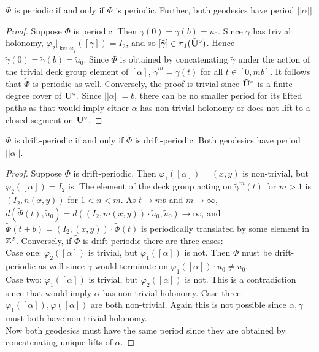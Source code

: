 \documentclass[]{article}
\def\btUs{\btU^\circ}
\def\utild{\tilde{u}_0}
\def\gamtild{\tilde{\gamma}}
\begin{document}
\begin{thm}
$\Phi$ is periodic if and only if $\tilde{\Phi}$ is periodic. Further, both geodesics have period $||\alpha||$.
\begin{proof}
Suppose $\Phi$ is periodic. Then $\gamma(0)=\gamma(b)=u_0$. Since $\gamma$ has trivial holonomy, $\varphi_2\big\vert_{\ker\varphi_1}([\gamma])=I_2$, and so $[\tilde{\gamma}]\in\pi_1(\btUs)$. Hence $\gamtild(0)=\gamtild(b)=\utild$. Since $\tilde{\Phi}$ is obtained by concatenating $\gamtild$ under the action of the trivial deck group element of $[\alpha]$, $\gamtild^m=\gamtild(t)$ for all $t\in[0,mb]$. It follows that $\tilde{\Phi}$ is periodic as well. Conversely, the proof is trivial since $\btUs$ is a finite degree cover of $\mathbf{U}^\circ.$ Since $||\alpha||=b$, there can be no smaller period for its lifted paths as that would imply either $\alpha$ has non-trivial holonomy or does not lift to a closed segment on $\mathbf{U}^\circ$.
\end{proof}
\end{thm}

\begin{thm}
$\Phi$ is drift-periodic if and only if $\tilde{\Phi}$ is drift-periodic. Both geodesics have period $||\alpha||$.
\begin{proof}
Suppose $\Phi$ is drift-periodic. Then $\varphi_1([\alpha])=(x,y)$ is non-trivial, but $\varphi_2([\alpha])=I_2$ is. The element of the deck group acting on $\gamtild^m(t)$ for $m>1$ is $(I_2,n(x,y))$ for $1<n<m$. As $t\to mb$ and $m\to\infty$, $d(\tilde\Phi(t),\utild)=d((I_2,m(x,y))\cdot \utild, \utild)\to\infty$, and $\tilde{\Phi}(t+b)=(I_2,(x,y))\cdot \tilde{\Phi}(t)$ is periodically translated by some element in $\mathbb{Z}^2$. Conversely, if $\tilde{\Phi}$ is drift-periodic there are three cases:\\
Case one: $\varphi_2([\alpha])$ is trivial, but $\varphi_1([\alpha])$ is not. Then $\Phi$ must be drift-periodic as well since $\gamma$ would terminate on $\varphi_1([\alpha])\cdot u_0\neq u_0$.\\
Case two: $\varphi_1([\alpha])$ is trivial, but $\varphi_2([\alpha])$ is not. This is a contradiction since that would imply $\alpha$ has non-trivial holonomy.
Case three:$\varphi_1([\alpha]),\varphi([\alpha])$ are both non-trivial. Again this is not possible since $\alpha,\gamma$ must both have non-trivial holonomy.\\
Now both geodesics must have the same period since they are obtained by concatenating unique lifts of $\alpha$.
\end{proof}
\end{thm}
\end{document}
